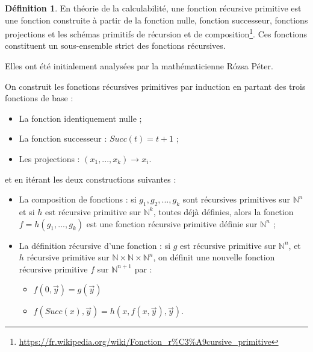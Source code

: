 \documentclass{book}
\theoremstyle{definition}
\newtheorem{definition}{Définition}
\numberwithin{lemma}{subsection}
\numberwithin{theorem}{subsection}
\numberwithin{definition}{subsection}
\numberwithin{proposition}{subsection}
\numberwithin{corollary}{subsection}
\numberwithin{property}{subsection}
\numberwithin{example}{subsection}
\numberwithin{heuristique}{subsection}
\numberwithin{scenario}{subsection}
\begin{document}
            \begin{definition}
            En théorie de la calculabilité, une fonction récursive primitive est une fonction construite à partir de la fonction nulle, fonction successeur, fonctions projections et les schémas primitifs de récursion et de composition\footnote{\url{https://fr.wikipedia.org/wiki/Fonction\_r\%C3\%A9cursive\_primitive}}. Ces fonctions constituent un sous-ensemble strict des fonctions récursives.
            \par Elles ont été initialement analysées par la mathématicienne Rózsa Péter.
            \par On construit les fonctions récursives primitives par induction en partant des trois fonctions de base :
            \begin{itemize}
            	\item La fonction identiquement nulle ;
            	\item La fonction successeur : $Succ(t)=t+1$ ;
            	\item Les projections : $(x_{1},...,x_{k})\rightarrow x_{i}$.
            \end{itemize}
            et en itérant les deux constructions suivantes :
            \begin{itemize}
            	\item La composition de fonctions : 
            si $g_{1}, g_{2}, ..., g_{k}$ sont récursives primitives sur $\mathbb {N} ^{n}$ 
            et si $h$ est récursive primitive sur $\mathbb {N} ^{k}$, toutes déjà définies,
            alors la fonction $f=h(g_{1},...,g_{k})$ est une fonction récursive primitive définie sur $\mathbb {N} ^{n}$ ;
            
            	\item La définition récursive d'une fonction : 
            si $g$ est récursive primitive sur $\mathbb {N} ^{n}$, et $h$ récursive primitive sur ${\mathbb  N}\times {\mathbb  N}\times {\mathbb  N}^{n}$, on définit une nouvelle fonction récursive primitive $f$ sur ${\mathbb  N}^{{n+1}}$ par :
            	\begin{itemize}
            		\item $f(0,\vec y) = g(\vec y)$
            		\item $ f(Succ(x),\vec y) = h(x,f(x,\vec y),\vec y)$.
            	\end{itemize}
            \end{itemize}
            \end{definition}
            
\end{document}
